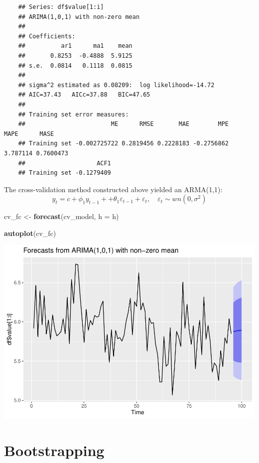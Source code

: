 \documentclass[11pt, a4paper]{report}
\newenvironment{Shaded}{\begin{snugshade}}{\end{snugshade}}
\newcommand{\DataTypeTok}[1]{\textcolor[rgb]{0.13,0.29,0.53}{#1}}
\newcommand{\KeywordTok}[1]{\textcolor[rgb]{0.13,0.29,0.53}{\textbf{#1}}}
\newcommand{\NormalTok}[1]{#1}
\newcommand{\StringTok}[1]{\textcolor[rgb]{0.31,0.60,0.02}{#1}}
\theoremstyle{plain}
\theoremstyle{plain}
\theoremstyle{remark}
\begin{document}
\begin{verbatim}
	## Series: df$value[1:i] 
	## ARIMA(1,0,1) with non-zero mean 
	## 
	## Coefficients:
	##          ar1      ma1    mean
	##       0.8253  -0.4888  5.9125
	## s.e.  0.0814   0.1118  0.0815
	## 
	## sigma^2 estimated as 0.08209:  log likelihood=-14.72
	## AIC=37.43   AICc=37.88   BIC=47.65
	## 
	## Training set error measures:
	##                        ME      RMSE       MAE        MPE     MAPE      MASE
	## Training set -0.002725722 0.2819456 0.2228183 -0.2756862 3.787114 0.7600473
	##                    ACF1
	## Training set -0.1279409
\end{verbatim}

The cross-validation method constructed above yielded an ARMA(1,1):
\[ y_t = c + \phi_1 y_{t-1} +  + \theta_1 \varepsilon_{t-1} + \varepsilon_t, \hspace{1em} \varepsilon_t \sim wn(0, \sigma^2)\]

\begin{Shaded}
	\begin{Highlighting}[]
		\NormalTok{cv_fc <-}\StringTok{ }\KeywordTok{forecast}\NormalTok{(cv_model, }\DataTypeTok{h =}\NormalTok{ h)}
		
		\KeywordTok{autoplot}\NormalTok{(cv_fc)}
	\end{Highlighting}
\end{Shaded}

\begin{center}\includegraphics{Econo2_P4_files/figure-latex/forecast cv plot-1} \end{center}

\section{Bootstrapping}
\end{document}
